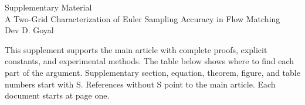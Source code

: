 

\renewcommand{\AIcitations}{\citep{openai_chatgpt,openai_codex,anthropic_claude_fable}}


\onecolumn
\setcounter{page}{1}
\begin{center}
{\Large Supplementary Material}\\[6pt]
{\large A Two-Grid Characterization of Euler Sampling Accuracy in Flow Matching}
\\[4pt]{\normalsize Dev D. Goyal}
\end{center}
This supplement supports the main article with complete proofs, explicit
constants, and experimental methods. The table below shows where to find
each part of the argument. Supplementary section, equation, theorem, figure, and
table numbers start with S. References without S point to the main article.
Each document starts at page one.

